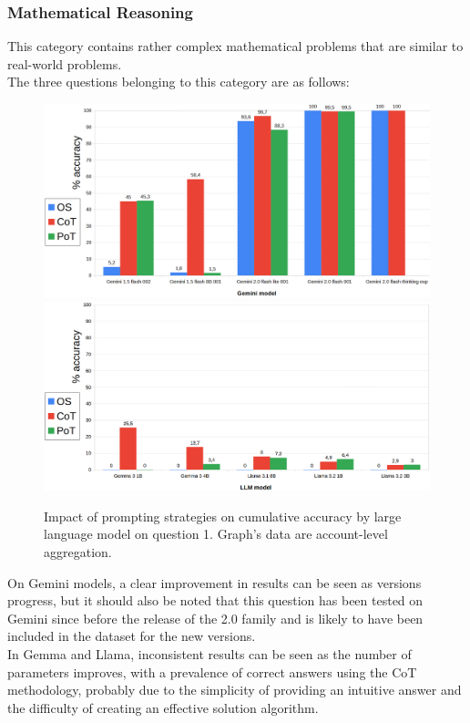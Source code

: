 \documentclass[12pt]{article}
\begin{document}
\subsubsection{Mathematical Reasoning} %
This category contains rather complex mathematical problems that are similar to real-world problems.\\ 
The three questions belonging to this category are as follows:\\


    \begin{figure}[H]
    \centering
            \includegraphics[width=1\textwidth]{q101Gemini.png}
            \includegraphics[width=1\textwidth]{q101Other.png}
    \caption[Accuracy on Question 1 by LLM]{Impact of prompting strategies on cumulative accuracy by large language model on question 1. Graph's data are account-level aggregation.}
    \label{fig:26}
    \end{figure} 
On Gemini models, a clear improvement in results can be seen as versions progress, but it should also be noted that this question has been tested on Gemini since before the release of the 2.0 family and is likely to have been included in the dataset for the new versions.\\
In Gemma and Llama, inconsistent results can be seen as the number of parameters improves, with a prevalence of correct answers using the CoT methodology, probably due to the simplicity of providing an intuitive answer and the difficulty of creating an effective solution algorithm.\\
\end{document}
